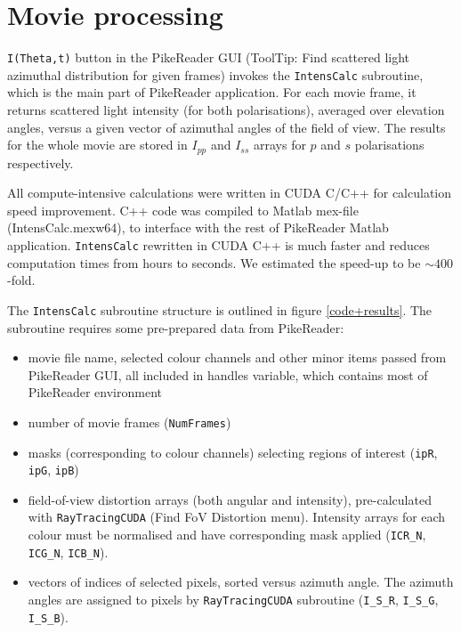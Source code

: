 \documentclass[12pt,dvips]{elsarticle}
\begin{document}
\section{Movie processing} \verb"I(Theta,t)" button in the PikeReader GUI (ToolTip: Find scattered light azimuthal
distribution for given frames) invokes the \verb"IntensCalc" subroutine, which is the main part of PikeReader application.
For each movie frame, it returns scattered light intensity (for both polarisations), averaged over elevation angles,
versus a given vector of azimuthal angles of the field of view. The results for the whole movie are stored in $I_{pp}$ and
$I_{ss}$ arrays for $p$ and $s$ polarisations respectively.

All compute-intensive calculations were written in CUDA C/C++ for calculation speed improvement. C++ code was compiled to
Matlab mex-file (IntensCalc.mexw64), to interface with the rest of PikeReader Matlab application. \verb"IntensCalc"
rewritten in CUDA C++ is much faster and reduces computation times from hours to seconds. We estimated the speed-up to be
$\sim 400$-fold.

The \verb"IntensCalc" subroutine structure is outlined in figure \ref{code+results}. The subroutine requires some
pre-prepared data from PikeReader:
\begin{itemize}
\item movie file name, selected colour channels and other minor items passed from PikeReader GUI, all included in handles
variable, which contains most of PikeReader environment

\item number of movie frames (\verb"NumFrames")

\item masks (corresponding to colour channels) selecting regions of interest (\verb"ipR", \verb"ipG", \verb"ipB")

\item field-of-view distortion arrays (both angular and intensity), pre-calculated with \verb"RayTracingCUDA" (Find FoV
Distortion menu). Intensity arrays for each colour must be normalised and have corresponding mask applied (\verb"ICR_N",
\verb"ICG_N", \verb"ICB_N").

\item vectors of indices of selected pixels, sorted versus azimuth angle. The azimuth angles are assigned to pixels by
\verb"RayTracingCUDA" subroutine (\verb"I_S_R", \verb"I_S_G", \verb"I_S_B").
\end{itemize}
\end{document}
